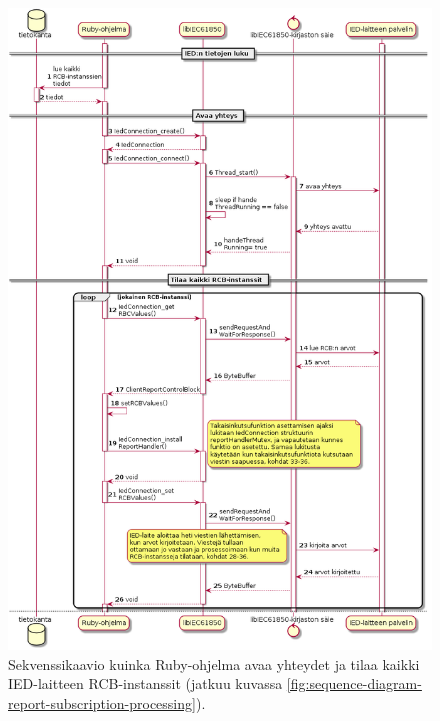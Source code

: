 \begin{figure}[ht!]
	\includegraphics[width=1\textwidth]{pictures/sequence-diagram-report-subscription.png}
	\caption{Sekvenssikaavio kuinka Ruby-ohjelma avaa yhteydet ja tilaa kaikki IED-laitteen RCB-instanssit (jatkuu kuvassa \ref{fig:sequence-diagram-report-subscription-processing}).}
	\label{fig:sequence-diagram-report-subscription}
\end{figure}


